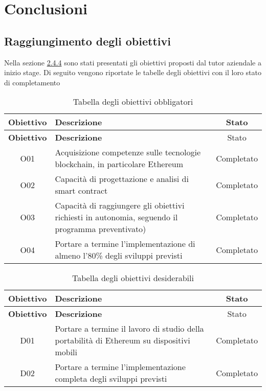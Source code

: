 
\chapter{Conclusioni}
\label{cap:conclusioni}

\section{Raggiungimento degli obiettivi}
Nella sezione \hyperref[sec:obiettivi]{2.4.4} sono stati presentati gli obiettivi proposti dal tutor aziendale a inizio stage.
Di seguito vengono riportate le tabelle degli obiettivi con il loro stato di completamento
\begin{center}
	\begin{longtable}{| c | p{23em} | c | }
		\caption{Tabella degli obiettivi obbligatori}
		\label{tab:obiettivi-obbligatori}\\
		\hline
		\textbf{Obiettivo} & \centering\textbf{Descrizione} & Stato\\
		\endfirsthead
		\hline
		\textbf{Obiettivo} & \centering\textbf{Descrizione} & Stato\\
		\endhead
		\endfoot
		
		\hline
		O01    & Acquisizione competenze sulle tecnologie blockchain, in particolare Ethereum  & Completato\\
		\hline
		O02    & Capacità di progettazione e analisi di smart contract & Completato\\
		\hline
		O03    & Capacità di raggiungere gli obiettivi richiesti in autonomia, seguendo il programma preventivato) & Completato\\
		\hline
		O04    & Portare a termine l'implementazione di almeno l'80\% degli sviluppi previsti & Completato\\
		\hline
	\end{longtable}
\end{center}

\begin{center}
	\begin{longtable}{| c | p{23em} | c |}
		\caption{Tabella degli obiettivi desiderabili}
		\label{tab:obiettivi-desiderabili}\\
		\hline
		\textbf{Obiettivo} & \centering\textbf{Descrizione} & Stato\\
		\endfirsthead
		\hline
		\textbf{Obiettivo} & \centering\textbf{Descrizione} & Stato\\
		\endhead
		\endfoot
		
		\hline
		D01    & Portare a termine il lavoro di studio della portabilità di Ethereum su dispositivi mobili & Completato\\
		\hline
		D02    & Portare a termine l’implementazione completa degli sviluppi previsti & Completato\\
		\hline
	\end{longtable}
\end{center}
	
